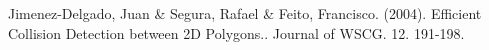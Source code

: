 	Jimenez-Delgado, Juan \& Segura, Rafael \& Feito, Francisco. (2004). Efficient Collision Detection between 2D Polygons.. Journal of WSCG. 12. 191-198. 


